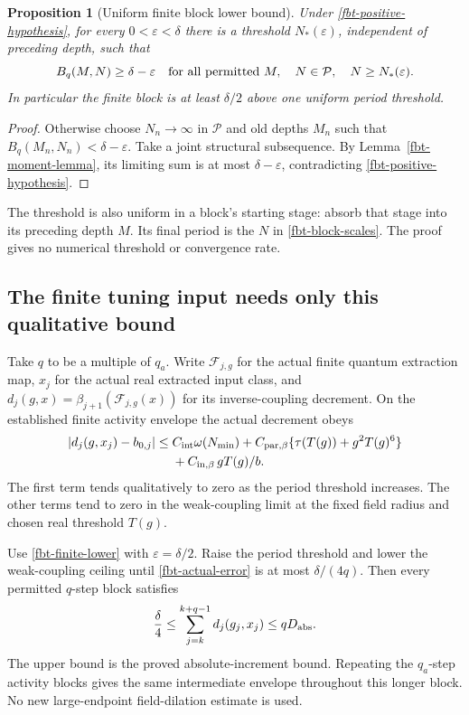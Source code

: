 \documentclass[11pt]{article}
\newtheorem{proposition}[theorem]{Proposition}
\theoremstyle{remark}
\begin{document}
\begin{proposition}[Uniform finite block lower bound]
\label{fbt-transfer-proposition}
Under \eqref{fbt-positive-hypothesis}, for every
\(0<\varepsilon<\delta\) there is a threshold
\(N_*(\varepsilon)\), independent of preceding depth,
such that
\begin{equation}
 B_q(M,N)\ge\delta-\varepsilon
 \quad\hbox{for all permitted }M,\quad
 N\in\mathcal P,\quad N\ge N_*(\varepsilon).
 \label{fbt-finite-lower}
\end{equation}
In particular the finite block is at least \(\delta/2\)
above one uniform period threshold.
\end{proposition}
\begin{proof}
Otherwise choose \(N_n\to\infty\) in \(\mathcal P\)
and old depths \(M_n\) such that
\(B_q(M_n,N_n)<\delta-\varepsilon\).
Take a joint structural subsequence. By
Lemma~\ref{fbt-moment-lemma}, its limiting sum is at most
\(\delta-\varepsilon\), contradicting
\eqref{fbt-positive-hypothesis}.
\end{proof}

The threshold is also uniform in a block's starting
stage: absorb that stage into its preceding depth \(M\).
Its final period is the \(N\) in
\eqref{fbt-block-scales}. The proof gives no numerical
threshold or convergence rate.

\subsection{The finite tuning input needs only this qualitative bound}
\label{fbt-tuning-section}

Take \(q\) to be a multiple of \(q_a\). Write
\(\mathcal F_{j,g}\) for the actual finite quantum extraction map,
\(x_j\) for the actual real extracted input class, and
\(d_j(g,x)=\beta_{j+1}(\mathcal F_{j,g}(x))\) for its
inverse-coupling decrement. On the established
finite activity envelope the actual decrement obeys
\begin{align}
 |d_j(g,x_j)-b_{0,j}|
 \le{}&C_{\rm int}\omega(N_{\min})
       +C_{{\rm par},\beta}
                    \{\tau(T(g))+g^2T(g)^6\}\notag\\
 &+C_{{\rm in},\beta}\,gT(g)/b.
 \label{fbt-actual-error}
\end{align}
The first term tends qualitatively to zero as the
period threshold increases. The other terms tend to
zero in the weak-coupling limit at the fixed field
radius and chosen real threshold \(T(g)\).

Use \eqref{fbt-finite-lower} with
\(\varepsilon=\delta/2\). Raise the period threshold
and lower the weak-coupling ceiling until
\eqref{fbt-actual-error} is at most \(\delta/(4q)\).
Then every permitted \(q\)-step block satisfies
\begin{equation}
 \frac{\delta}{4}\le
       \sum_{j=k}^{k+q-1}d_j(g_j,x_j)
       \le qD_{\rm abs}.
 \label{fbt-actual-block}
\end{equation}
The upper bound is the proved absolute-increment bound.
Repeating the \(q_a\)-step activity blocks gives the same
intermediate envelope throughout this longer block.
No new large-endpoint field-dilation estimate is used.
\end{document}

